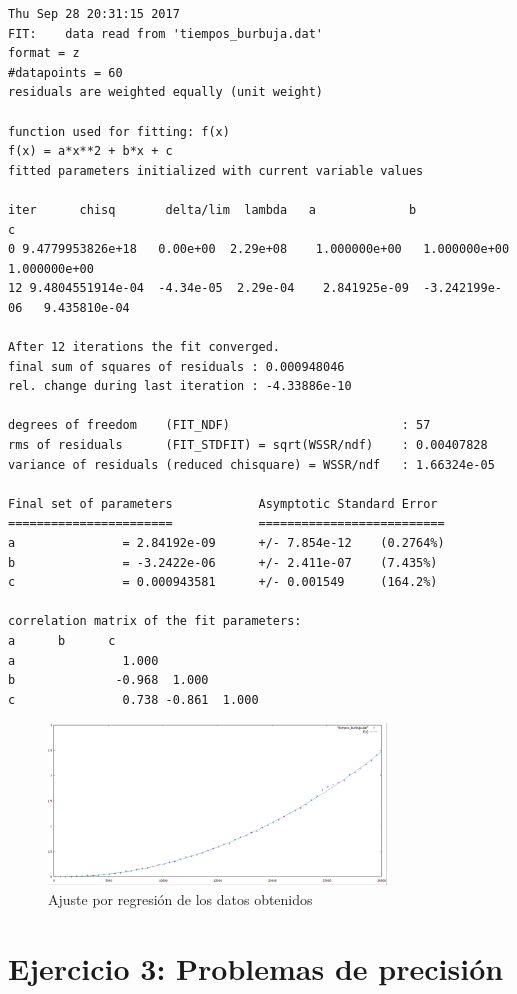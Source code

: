 \documentclass[paper=a4, fontsize=10pt]{scrartcl} %
\begin{document}
\begin{lstlisting}
Thu Sep 28 20:31:15 2017
FIT:    data read from 'tiempos_burbuja.dat'
format = z
#datapoints = 60
residuals are weighted equally (unit weight)

function used for fitting: f(x)
f(x) = a*x**2 + b*x + c
fitted parameters initialized with current variable values

iter      chisq       delta/lim  lambda   a             b             c            
0 9.4779953826e+18   0.00e+00  2.29e+08    1.000000e+00   1.000000e+00   1.000000e+00
12 9.4804551914e-04  -4.34e-05  2.29e-04    2.841925e-09  -3.242199e-06   9.435810e-04

After 12 iterations the fit converged.
final sum of squares of residuals : 0.000948046
rel. change during last iteration : -4.33886e-10

degrees of freedom    (FIT_NDF)                        : 57
rms of residuals      (FIT_STDFIT) = sqrt(WSSR/ndf)    : 0.00407828
variance of residuals (reduced chisquare) = WSSR/ndf   : 1.66324e-05

Final set of parameters            Asymptotic Standard Error
=======================            ==========================
a               = 2.84192e-09      +/- 7.854e-12    (0.2764%)
b               = -3.2422e-06      +/- 2.411e-07    (7.435%)
c               = 0.000943581      +/- 0.001549     (164.2%)

correlation matrix of the fit parameters:
a      b      c      
a               1.000 
b              -0.968  1.000 
c               0.738 -0.861  1.000 
\end{lstlisting}

\begin{figure}[H] %
	\centering
	\label{lsblk}
	\includegraphics[width=0.8\textwidth]{../imgs/c3.PNG}
	\caption{Ajuste por regresión de los datos obtenidos} 
\end{figure}

\section{Ejercicio 3:  Problemas de precisión}
\end{document}
